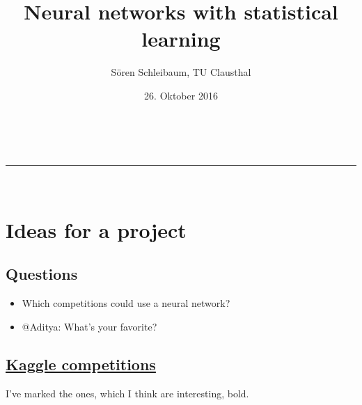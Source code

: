 \documentclass[a4paper,11pt]{article}
\makeatletter
\newcommand{\linia}{\rule{\linewidth}{0.5pt}}
\theoremstyle{mytheor}
\renewcommand{\maketitle}{
\begin{center}
\vspace{2ex}
{\huge \textsc{\@title}}
\vspace{1ex}
\\
\linia\\
\@author \hfill \@date
\vspace{4ex}
\end{center}
}
\makeatother
\begin{document}
\title{Neural networks with statistical learning}

\author{Sören Schleibaum, TU Clausthal}

\date{26. Oktober 2016}

\maketitle

\section{Ideas for a project}

\subsection*{Questions}

\begin{itemize}[noitemsep]
 \item Which competitions could use a neural network?
 \item @Aditya: What's your favorite?
\end{itemize}


\subsection*{\href{https://www.kaggle.com/competitions}{Kaggle competitions}}

I've marked the ones, which I think are interesting, bold.
\end{document}
